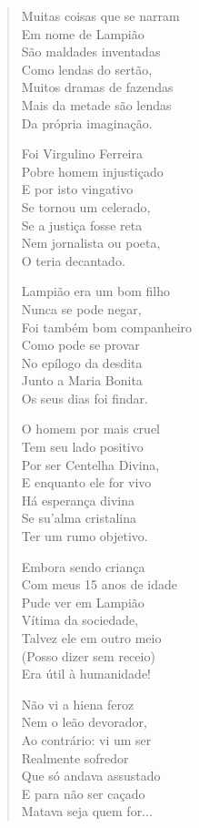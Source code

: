\begin{verse}
Muitas coisas que se narram \\
Em nome de Lampião \\
São maldades inventadas \\
Como lendas do sertão, \\
Muitos dramas de fazendas \\
Mais da metade são lendas \\
Da própria imaginação. 

Foi Virgulino Ferreira \\
Pobre homem injustiçado \\
E por isto vingativo \\
Se tornou um celerado, \\
Se a justiça fosse reta \\
Nem jornalista ou poeta, \\
O teria decantado. 

Lampião era um bom filho \\
Nunca se pode negar, \\
Foi também bom companheiro \\
Como pode se provar \\
No epílogo da desdita \\
Junto a Maria Bonita \\
Os seus dias foi findar. 


O homem por mais cruel \\
Tem seu lado positivo \\
Por ser Centelha Divina, \\
E enquanto ele for vivo \\
Há esperança divina \\
Se su'alma cristalina \\
Ter um rumo objetivo. 

Embora sendo criança \\
Com meus 15 anos de idade \\
Pude ver em Lampião \\
Vítima da sociedade, \\
Talvez ele em outro meio \\
(Posso dizer sem receio) \\
Era útil à humanidade! 

Não vi a hiena feroz \\
Nem o leão devorador, \\
Ao contrário: vi um ser \\
Realmente sofredor \\
Que só andava assustado \\
E para não ser caçado \\
Matava seja quem for... 


\end{verse}
